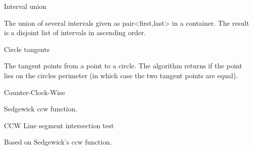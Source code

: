 \begin{algorithm}{Interval union}

The union of several intervals given as pair<first,last> in a container. The
result is a disjoint list of intervals in ascending order.
\end{algorithm}

\begin{algorithm}{Circle tangents}

The tangent points from a point to a circle. The algorithm returns if
the point lies on the circles perimeter (in which case the two tangent
points are equal).
\end{algorithm}

\begin{algorithm}{Counter-Clock-Wise}

Sedgewick ccw function.
\end{algorithm}

\begin{algorithm}{CCW Line segment intersection test}

Based on Sedgewick's ccw function.
\end{algorithm}
